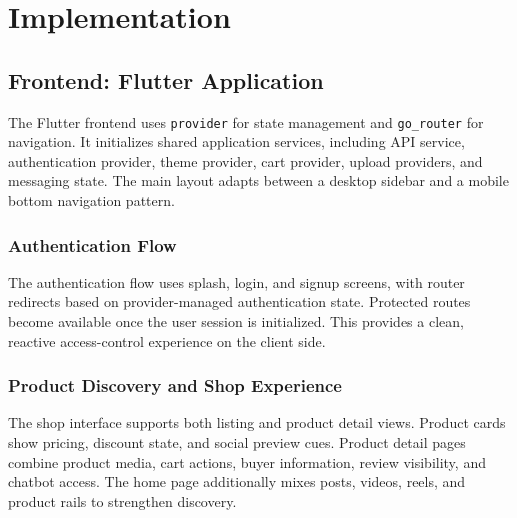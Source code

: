 \documentclass[12pt,letterpaper]{report}
\begin{document}
\chapter{Implementation}

\section{Frontend: Flutter Application}

The Flutter frontend uses \texttt{provider} for state management and \texttt{go\_router} for navigation. It initializes shared application services, including API service, authentication provider, theme provider, cart provider, upload providers, and messaging state. The main layout adapts between a desktop sidebar and a mobile bottom navigation pattern.

\subsection{Authentication Flow}

The authentication flow uses splash, login, and signup screens, with router redirects based on provider-managed authentication state. Protected routes become available once the user session is initialized. This provides a clean, reactive access-control experience on the client side.


\subsection{Product Discovery and Shop Experience}

The shop interface supports both listing and product detail views. Product cards show pricing, discount state, and social preview cues. Product detail pages combine product media, cart actions, buyer information, review visibility, and chatbot access. The home page additionally mixes posts, videos, reels, and product rails to strengthen discovery.

\end{document}
